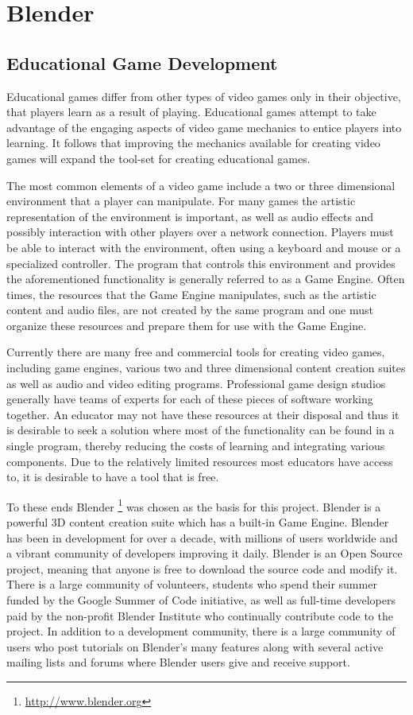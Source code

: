\chapter{Blender}
\label{chapter:blender}

\section{Educational Game Development}
Educational games differ from other types of video games only in their
objective, that players learn as a result of playing. Educational games attempt
to take advantage of the engaging aspects of video game mechanics to entice
players into learning. It follows that improving the mechanics available for
creating video games will expand the tool-set for creating educational games.


The most common elements of a video game include a two or three dimensional
environment that a player can manipulate. For many games the artistic
representation of the environment is important, as well as audio effects and
possibly interaction with other players over a network connection. Players must
be able to interact with the environment, often using a keyboard and mouse or a
specialized controller. The program that controls this environment and
provides the aforementioned functionality is generally referred to as a Game
Engine. Often times, the resources that the Game Engine manipulates, such as
the artistic content and audio files, are not created by the same program and
one must organize these resources and prepare them for use with the Game
Engine.


Currently there are many free and commercial tools for creating video games,
including game engines, various two and three dimensional content creation
suites as well as audio and video editing programs. Professional game design
studios generally have teams of experts for each of these pieces of software
working together. An educator may not have these resources at their disposal and
thus it is desirable to seek a solution where most of the functionality can be
found in a single program, thereby reducing the costs of learning and integrating
various components. Due to the relatively limited resources most educators have
access to, it is desirable to have a tool that is free. 


To these ends Blender \footnote{\url{http://www.blender.org}} was chosen as the basis for this project.
Blender is a powerful 3D content creation suite which has a built-in Game
Engine. Blender has been in development for over a decade, with millions of
users worldwide and a vibrant community of developers improving it daily.
Blender is an Open Source project, meaning that anyone is free to download the
source code and modify it. There is a large community of volunteers, students
who spend their summer funded by the Google Summer of Code initiative, as well
as full-time developers paid by the non-profit Blender Institute who
continually contribute code to the project. In addition to a development
community, there is a large community of users who post tutorials on Blender's
many features along with several active mailing lists and forums where Blender users give and
receive support.



